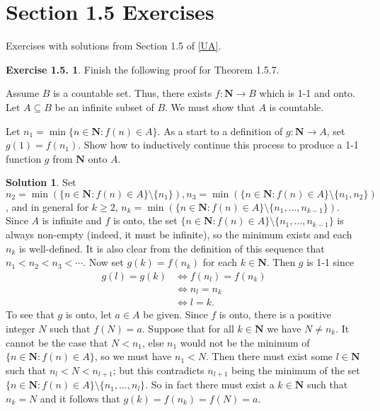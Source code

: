 \documentclass[12pt]{article}
\theoremstyle{definition}
\theoremstyle{exercise}
\newtheorem{exercise}{Exercise 1.5.}
\theoremstyle{solution}
\newtheorem*{solution}{Solution}
\newcommand{\N}{\mathbf{N}}
\begin{document}
\section{Section 1.5 Exercises}

Exercises with solutions from Section 1.5 of \hyperlink{ua}{[UA]}.

\begin{exercise}
\label{ex:1}
    Finish the following proof for Theorem 1.5.7.

    Assume \( B \) is a countable set. Thus, there exists \( f : \N \to B \) which is 1-1 and onto. Let \( A \subseteq B \) be an infinite subset of \( B \). We must show that \( A \) is countable.

    Let \( n_1 = \min \{ n \in \N : f(n) \in A \} \). As a start to a definition of \( g : \N \to A \), set \( g(1) = f(n_1) \). Show how to inductively continue this process to produce a 1-1 function \( g \) from \( \N \) onto \( A \).
\end{exercise}

\begin{solution}
    Set \( n_2 = \min (\{ n \in \N : f(n) \in A \} \setminus \{ n_1 \}), n_3 = \min (\{ n \in \N : f(n) \in A \} \setminus \{ n_1, n_2 \}) \), and in general for \( k \geq 2 \), \( n_k = \min (\{ n \in \N : f(n) \in A \} \setminus \{ n_1, \ldots, n_{k-1} \}) \). Since \( A \) is infinite and \( f \) is onto, the set \( \{ n \in \N : f(n) \in A \} \setminus \{ n_1, \ldots, n_{k-1} \} \) is always non-empty (indeed, it must be infinite), so the minimum exists and each \( n_k \) is well-defined. It is also clear from the definition of this sequence that \( n_1 < n_2 < n_3 < \cdots \). Now set \( g(k) = f(n_k) \) for each \( k \in \N \). Then \( g \) is 1-1 since
    \begin{align*}
        g(l) = g(k) &\iff f(n_l) = f(n_k) \\
        &\iff n_l = n_k \tag{f is 1-1} \\
        &\iff l = k. \tag{sequence is increasing}
    \end{align*}
    To see that \( g \) is onto, let \( a \in A \) be given. Since \( f \) is onto, there is a positive integer \( N \) such that \( f(N) = a \). Suppose that for all \( k \in \N \) we have \( N \neq n_k \). It cannot be the case that \( N < n_1 \), else \( n_1 \) would not be the minimum of \( \{ n \in \N : f(n) \in A \} \), so we must have \( n_1 < N \). Then there must exist some \( l \in \N \) such that \( n_l < N < n_{l+1} \); but this contradicts \( n_{l+1} \) being the minimum of the set \( \{ n \in \N : f(n) \in A \} \setminus \{ n_1, \ldots, n_l \} \). So in fact there must exist a \( k \in \N \) such that \( n_k = N \) and it follows that \( g(k) = f(n_k) = f(N) = a \).
\end{solution}
\end{document}

